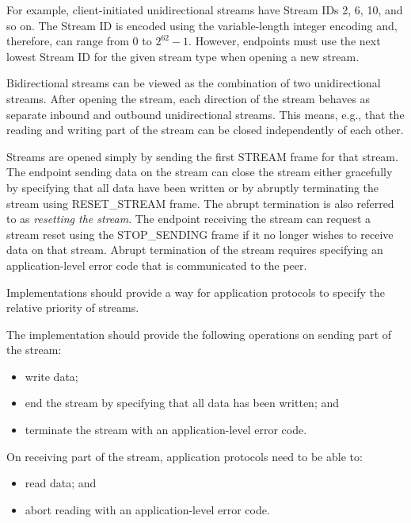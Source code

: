 For example, client-initiated unidirectional streams have Stream IDs 2, 6, 10, and so on. The Stream
ID is encoded using the variable-length integer encoding and, therefore, can range from 0 to
$2^{62}-1$. However, endpoints must use the next lowest Stream ID for the given stream type when
opening a new stream.

Bidirectional streams can be viewed as the combination of two unidirectional streams. After opening
the stream, each direction of the stream behaves as separate inbound and outbound unidirectional
streams. This means, e.g., that the reading and writing part of the stream can be closed
independently of each other.

Streams are opened simply by sending the first STREAM frame for that stream. The endpoint sending
data on the stream can close the stream either gracefully by specifying that all data have been
written or by abruptly terminating the stream using RESET\_STREAM frame. The abrupt termination is
also referred to as \textit{resetting the stream}. The endpoint receiving the stream can request a
stream reset using the STOP\_SENDING frame if it no longer wishes to receive data on that stream.
Abrupt termination of the stream requires specifying an application-level error code that is
communicated to the peer.

Implementations should provide a way for application protocols to specify the relative priority of
streams.

The implementation should provide the following operations on sending part of the stream:

\begin{itemize}

  \item write data;

  \item end the stream by specifying that all data has been written; and

  \item terminate the stream with an application-level error code.

\end{itemize}

On receiving part of the stream, application protocols need to be able to:

\begin{itemize}

  \item read data; and

  \item abort reading with an application-level error code.

\end{itemize}

